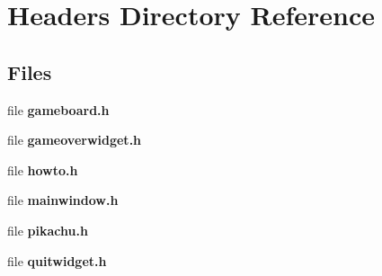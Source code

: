 \section{Headers Directory Reference}
\label{dir_692516b589a32b3bfce781ca9f6d1534}
\subsection*{Files}
\begin{DoxyCompactItemize}
\item 
file {\bf gameboard.\+h}
\item 
file {\bf gameoverwidget.\+h}
\item 
file {\bf howto.\+h}
\item 
file {\bf mainwindow.\+h}
\item 
file {\bf pikachu.\+h}
\item 
file {\bf quitwidget.\+h}
\end{DoxyCompactItemize}
